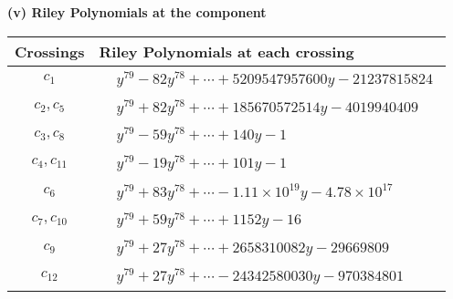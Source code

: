 \documentclass[1p]{elsarticle_modified}
\theoremstyle{definition}
\begin{document}
\newpage\renewcommand{\arraystretch}{1}
\flushleft \textbf{(v) Riley Polynomials at the component}\newline \\
\begin{tabular}{m{50pt}|m{274pt}}
Crossings & \hspace{64pt}Riley Polynomials at each crossing \\
\hline $$\begin{aligned}c_{1}\end{aligned}$$&$\begin{aligned}
&y^{79}-82 y^{78}+\cdots+5209547957600 y-21237815824
\end{aligned}$\\
\hline $$\begin{aligned}c_{2},c_{5}\end{aligned}$$&$\begin{aligned}
&y^{79}+82 y^{78}+\cdots+185670572514 y-4019940409
\end{aligned}$\\
\hline $$\begin{aligned}c_{3},c_{8}\end{aligned}$$&$\begin{aligned}
&y^{79}-59 y^{78}+\cdots+140 y-1
\end{aligned}$\\
\hline $$\begin{aligned}c_{4},c_{11}\end{aligned}$$&$\begin{aligned}
&y^{79}-19 y^{78}+\cdots+101 y-1
\end{aligned}$\\
\hline $$\begin{aligned}c_{6}\end{aligned}$$&$\begin{aligned}
&y^{79}+83 y^{78}+\cdots-1.11\times10^{19} y-4.78\times10^{17}
\end{aligned}$\\
\hline $$\begin{aligned}c_{7},c_{10}\end{aligned}$$&$\begin{aligned}
&y^{79}+59 y^{78}+\cdots+1152 y-16
\end{aligned}$\\
\hline $$\begin{aligned}c_{9}\end{aligned}$$&$\begin{aligned}
&y^{79}+27 y^{78}+\cdots+2658310082 y-29669809
\end{aligned}$\\
\hline $$\begin{aligned}c_{12}\end{aligned}$$&$\begin{aligned}
&y^{79}+27 y^{78}+\cdots-24342580030 y-970384801
\end{aligned}$\\
\hline
\end{tabular}\\~\\
\end{document}

